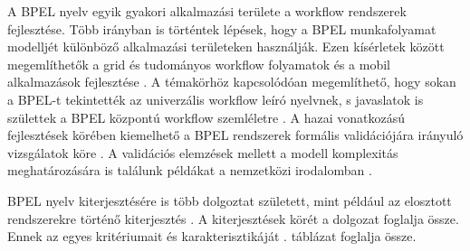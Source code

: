 A BPEL nyelv egyik gyakori alkalmazási területe a workflow rendszerek fejlesztése. Több irányban is történtek lépések, hogy a BPEL munkafolyamat modelljét különböző alkalmazási területeken használják. Ezen kísérletek között megemlíthetők a grid és tudományos  workflow folyamatok \cite{slominski2007adapting} és a mobil alkalmazások fejlesztése \cite{hackmann2006sliver}.\newpage
A témakörhöz kapcsolódóan megemlíthető, hogy sokan a BPEL-t tekintették az univerzális workflow leíró nyelvnek, s javaslatok is születtek a BPEL központú workflow szemléletre \cite{van2008translating}. A  hazai vonatkozású fejlesztések körében kiemelhető a BPEL rendszerek formális validációjára irányuló vizsgálatok köre \cite{kovacs2008formal}. A validációs elemzések mellett a modell komplexitás meghatározására is találunk példákat a nemzetközi irodalomban  \cite{cardoso2007complexity}.

BPEL nyelv kiterjesztésére is több dolgoztat született, mint például az elosztott rendszerekre történő kiterjesztés \cite{baresi2007towards}. A kiterjesztések körét a \cite{kopp2011classification} dolgozat foglalja össze. Ennek az egyes kritériumait és karakterisztikáját . táblázat foglalja össze.

